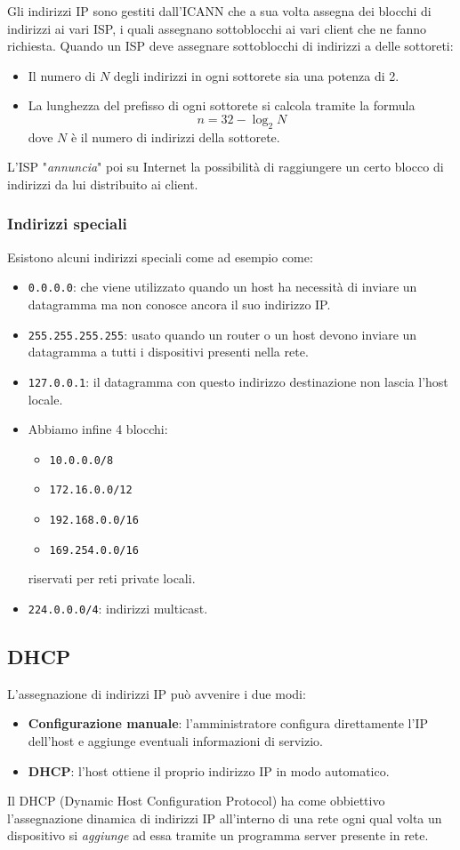 Gli indirizzi IP sono gestiti dall'ICANN che a sua volta assegna dei blocchi di indirizzi ai vari
ISP, i quali assegnano sottoblocchi ai vari client che ne fanno richiesta. Quando un ISP deve 
assegnare sottoblocchi di indirizzi a delle sottoreti:
\begin{itemize}
	\item Il numero di $N$ degli indirizzi in ogni sottorete sia una potenza di 2.
	\item La lunghezza del prefisso di ogni sottorete si calcola tramite la formula
		\[ n = 32 - \log_2 N \]
		dove $N$ è il numero di indirizzi della sottorete.
\end{itemize}
L'ISP "\emph{annuncia}" poi su Internet la possibilità di raggiungere un certo blocco di indirizzi
da lui distribuito ai client.

\subsubsection{Indirizzi speciali}
Esistono alcuni indirizzi speciali come ad esempio come:
\begin{itemize}
	\item \verb|0.0.0.0|: che viene utilizzato quando un host ha necessità di inviare un 
		datagramma ma non conosce ancora il suo indirizzo IP.
	\item \verb|255.255.255.255|: usato quando un router o un host devono inviare un datagramma a
		tutti i dispositivi presenti nella rete.
	\item \verb|127.0.0.1|: il datagramma con questo indirizzo destinazione non lascia l'host 
		locale.
	\item Abbiamo infine 4 blocchi:
		\begin{itemize}
			\item \verb|10.0.0.0/8|
			\item \verb|172.16.0.0/12|
			\item \verb|192.168.0.0/16|
			\item \verb|169.254.0.0/16|
		\end{itemize}
		riservati per reti private locali.
	\item \verb|224.0.0.0/4|: indirizzi multicast.
\end{itemize}

\subsection{DHCP}
L'assegnazione di indirizzi IP può avvenire i due modi:
\begin{itemize}
	\item \textbf{Configurazione manuale}: l'amministratore configura direttamente l'IP dell'host
		e aggiunge eventuali informazioni di servizio.
	\item \textbf{DHCP}: l'host ottiene il proprio indirizzo IP in modo automatico.
\end{itemize}
Il DHCP (Dynamic Host Configuration Protocol) ha come obbiettivo l'assegnazione dinamica di 
indirizzi IP all'interno di una rete ogni qual volta un dispositivo si \emph{aggiunge} ad essa 
tramite un programma server presente in rete.

